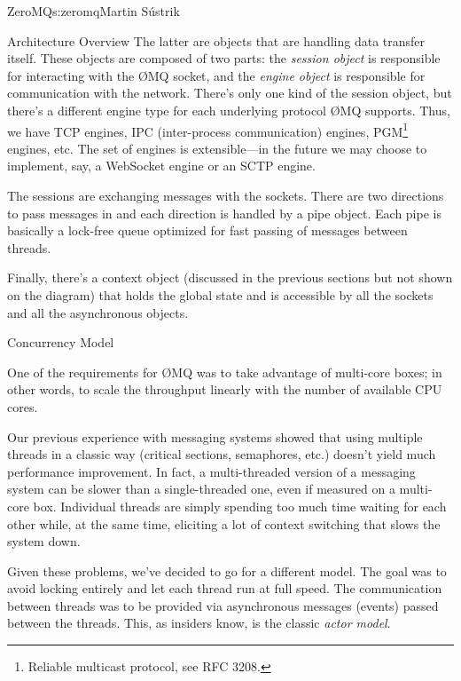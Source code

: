 \begin{aosachapter}{ZeroMQ}{s:zeromq}{Martin S\'{u}strik}
\begin{aosasect1}{Architecture Overview}
The latter are objects that are handling data transfer itself. These
objects are composed of two parts: the \emph{session object} is responsible for
interacting with the {\O}MQ socket, and the \emph{engine object} is responsible for
communication with the network. There's only one kind of the session
object, but there's a different engine type for each underlying
protocol {\O}MQ supports. Thus, we have TCP engines, IPC (inter-process
communication) engines, PGM\footnote{Reliable multicast protocol, see RFC 3208.}
engines, etc. The set of engines is extensible---in the future we may
choose to implement, say, a WebSocket engine or an SCTP engine.

The sessions are exchanging messages with the sockets. There are two
directions to pass messages in and each direction is handled by a pipe
object. Each pipe is basically a lock-free queue optimized for fast passing
of messages between threads.

Finally, there's a context object (discussed in the previous sections but
not shown on the diagram) that holds the global state and is
accessible by all the sockets and all the asynchronous objects.

\end{aosasect1}

\begin{aosasect1}{Concurrency Model}

One of the requirements for {\O}MQ was to take advantage of multi-core
boxes; in other words, to scale the throughput linearly with the number of
available CPU cores.

Our previous experience with messaging systems showed that using
multiple threads in a classic way (critical sections, semaphores, etc.)
doesn't yield much performance improvement. In fact, a multi-threaded
version of a messaging system can be slower than a single-threaded
one, even if measured on a multi-core box. Individual threads are
simply spending too much time waiting for each other while, at the
same time, eliciting a lot of context switching that slows the system
down.

Given these problems, we've decided to go for a different model. The
goal was to avoid locking entirely and let each thread run at full
speed. The communication between threads was to be provided via
asynchronous messages (events) passed between the threads. This, as
insiders know, is the classic \emph{actor
model}.


\end{aosasect1}
\end{aosachapter}
